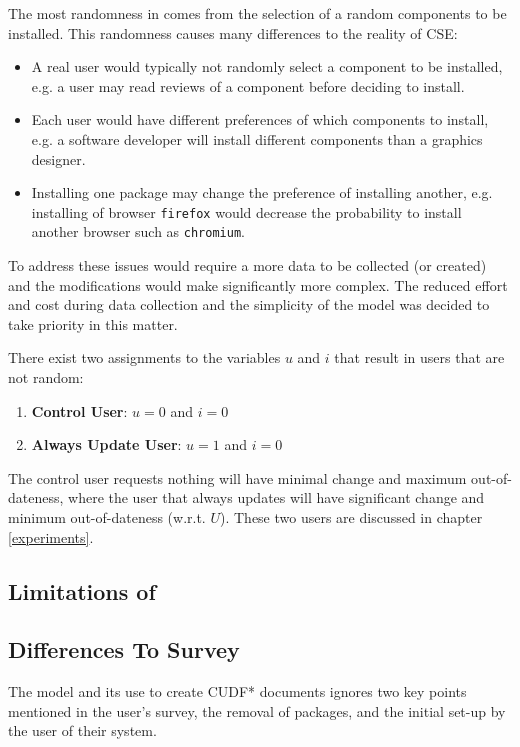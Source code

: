 The most randomness in \usermodel comes from the selection of a random components to be installed.
This randomness causes many differences to the reality of CSE:
\begin{itemize}
  \item A real user would typically not randomly select a component to be installed, e.g. a user may read reviews of a component before deciding to install.
  \item Each user would have different preferences of which components to install, e.g. a software developer will install different components than a graphics designer.
  \item Installing one package may change the preference of installing another, e.g. installing of browser \texttt{firefox} would decrease the probability to install another browser such as \texttt{chromium}.
\end{itemize}
To address these issues would require a more data to be collected (or created) and the modifications would make \usermodel significantly more complex.
The reduced effort and cost during data collection and the simplicity of the model was decided to take priority in this matter.

There exist two assignments to the variables $u$ and $i$ that result in users that are not random:
\begin{enumerate}
  \item \textbf{Control User}: $u = 0$ and $i = 0$
  \item \textbf{Always Update User}: $u = 1$ and $i = 0$
\end{enumerate}
The control user requests nothing will have minimal change and maximum out-of-dateness, 
where the user that always updates will have significant change and minimum out-of-dateness (w.r.t. $U$).
These two users are discussed in chapter \ref{experiments}.

\subsection{Limitations of \usermodel}

\subsection{Differences To Survey}
The \usermodel model and its use to create CUDF* documents ignores two key points mentioned in the user's survey,
the removal of packages, and the initial set-up by the user of their system.

